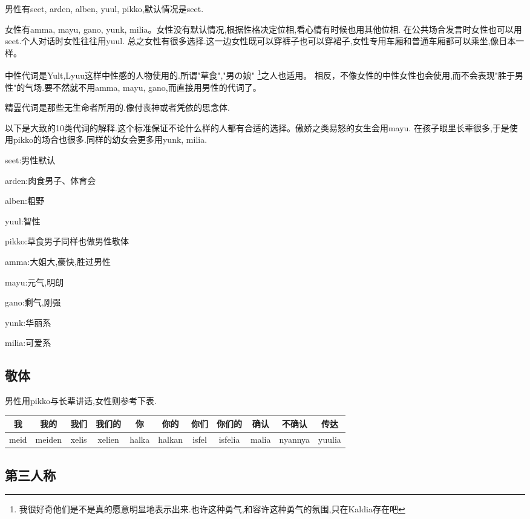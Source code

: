 男性有seet, arden, alben, yuul, pikko,默认情况是seet.

女性有amma, mayu, gano, yunk, milia。女性没有默认情况,根据性格决定位相,看心情有时候也用其他位相.
在公共场合发言时女性也可以用seet.个人对话时女性往往用yuul.
总之女性有很多选择.这一边女性既可以穿裤子也可以穿裙子,女性专用车厢和普通车厢都可以乘坐,像日本一样。

中性代词是Yult,Lyuu这样中性感的人物使用的.所谓"草食","男の娘"
\footnote{我很好奇他们是不是真的愿意明显地表示出来.也许这种勇气,和容许这种勇气的氛围,只在Kaldia存在吧}之人也适用。
相反，不像女性的中性女性也会使用,而不会表现"胜于男性"的气场.要不然就不用amma, mayu, gano,而直接用男性的代词了。

精霊代词是那些无生命者所用的.像付丧神或者凭依的思念体.

以下是大致的10类代词的解释.这个标准保证不论什么样的人都有合适的选择。傲娇之类易怒的女生会用mayu.
在孩子眼里长辈很多,于是使用pikko的场合也很多.同样的幼女会更多用yunk, milia.

seet:男性默认

arden:肉食男子、体育会

alben:粗野

yuul:智性

pikko:草食男子同样也做男性敬体

amma:大姐大,豪快,胜过男性

mayu:元气,明朗

gano:剩气,刚强

yunk:华丽系

milia:可爱系

\subsection{敬体}

男性用pikko与长辈讲话,女性则参考下表.
\begin{table}[H]
		\begin{tabular}{|c|c|c|c|c|c|c|c|c|c|c|} %
			\hline
			我&     我的&       我们&     我们的&     你&     你的&  你们&     你们的&     确认&  不确认&  传达\\\hline
			meid&   meiden&     xelis&  xelien&  halka&  halkan&  isfel&  isfelia&  malia&  nyannya&  yuulia\\\hline
	\end{tabular}
\end{table}

\subsection{第三人称}


